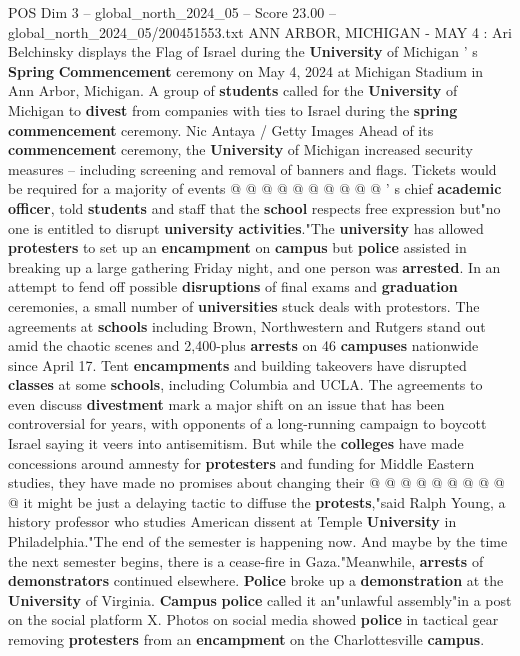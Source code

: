 \begin{textsample}{POS Dim 3 – global\_north\_2024\_05 – Score 23.00 – global\_north\_2024\_05/200451553.txt}
ANN ARBOR, MICHIGAN - MAY 4 : Ari Belchinsky displays the Flag of Israel during the \textbf{University} of Michigan ' s \textbf{Spring} \textbf{Commencement} ceremony on May 4, 2024 at Michigan Stadium in Ann Arbor, Michigan.
A group of \textbf{students} called for the \textbf{University} of Michigan to \textbf{divest} from companies with ties to Israel during the \textbf{spring} \textbf{commencement} ceremony.
Nic Antaya / Getty Images Ahead of its \textbf{commencement} ceremony, the \textbf{University} of Michigan increased security measures -- including screening and removal of banners and flags.
Tickets would be required for a majority of events @ @ @ @ @ @ @ @ @ @ ' s chief \textbf{academic} \textbf{officer}, told \textbf{students} and staff that the \textbf{school} respects free expression but"no one is entitled to disrupt \textbf{university} \textbf{activities}."The \textbf{university} has allowed \textbf{protesters} to set up an \textbf{encampment} on \textbf{campus} but \textbf{police} assisted in breaking up a large gathering Friday night, and one person was \textbf{arrested}.
In an attempt to fend off possible \textbf{disruptions} of final exams and \textbf{graduation} ceremonies, a small number of \textbf{universities} stuck deals with protestors.
The agreements at \textbf{schools} including Brown, Northwestern and Rutgers stand out amid the chaotic scenes and 2,400-plus \textbf{arrests} on 46 \textbf{campuses} nationwide since April 17.
Tent \textbf{encampments} and building takeovers have disrupted \textbf{classes} at some \textbf{schools}, including Columbia and UCLA.
The agreements to even discuss \textbf{divestment} mark a major shift on an issue that has been controversial for years, with opponents of a long-running campaign to boycott Israel saying it veers into antisemitism.
But while the \textbf{colleges} have made concessions around amnesty for \textbf{protesters} and funding for Middle Eastern studies, they have made no promises about changing their @ @ @ @ @ @ @ @ @ @ it might be just a delaying tactic to diffuse the \textbf{protests},"said Ralph Young, a history professor who studies American dissent at Temple \textbf{University} in Philadelphia."The end of the semester is happening now.
And maybe by the time the next semester begins, there is a cease-fire in Gaza."Meanwhile, \textbf{arrests} of \textbf{demonstrators} continued elsewhere. \textbf{Police} broke up a \textbf{demonstration} at the \textbf{University} of Virginia. \textbf{Campus} \textbf{police} called it an"unlawful assembly"in a post on the social platform X.
Photos on social media showed \textbf{police} in tactical gear removing \textbf{protesters} from an \textbf{encampment} on the Charlottesville \textbf{campus}.

\end{textsample}
